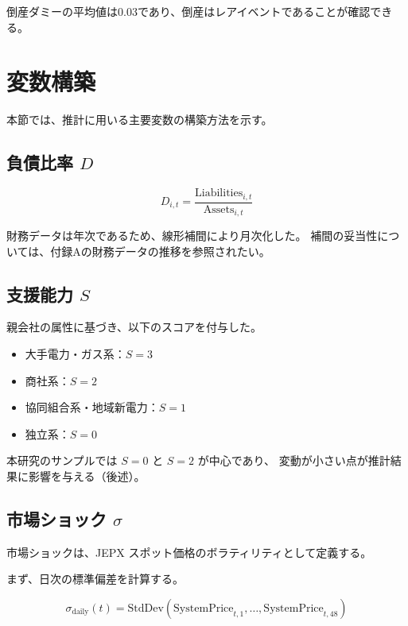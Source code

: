 倒産ダミーの平均値は0.03であり、倒産はレアイベントであることが確認できる。

\section{変数構築}
\label{sec:variables}

本節では、推計に用いる主要変数の構築方法を示す。

\subsection{負債比率 $D$}



\[
D_{i,t}=\frac{\text{Liabilities}_{i,t}}{\text{Assets}_{i,t}}
\]



財務データは年次であるため、線形補間により月次化した。
補間の妥当性については、付録Aの財務データの推移を参照されたい。

\subsection{支援能力 $S$}

親会社の属性に基づき、以下のスコアを付与した。

\begin{itemize}
  \item 大手電力・ガス系：$S=3$
  \item 商社系：$S=2$
  \item 協同組合系・地域新電力：$S=1$
  \item 独立系：$S=0$
\end{itemize}

本研究のサンプルでは $S=0$ と $S=2$ が中心であり、
変動が小さい点が推計結果に影響を与える（後述）。

\subsection{市場ショック $\sigma$}

市場ショックは、JEPX スポット価格のボラティリティとして定義する。

まず、日次の標準偏差を計算する。



\[
\sigma_{\mathrm{daily}}(t)
=
\mathrm{StdDev}
\left(
\mathrm{SystemPrice}_{t,1},\ldots,\mathrm{SystemPrice}_{t,48}
\right)
\]



